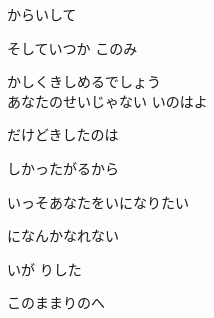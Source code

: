 {からいして

そしていつか このみ

かしくきしめるでしょう
\\

あなたのせいじゃない いのはよ

だけどきしたのは

しかったがるから

いっそあなたをいになりたい

になんかなれない

いが りした

このままりのへ

}